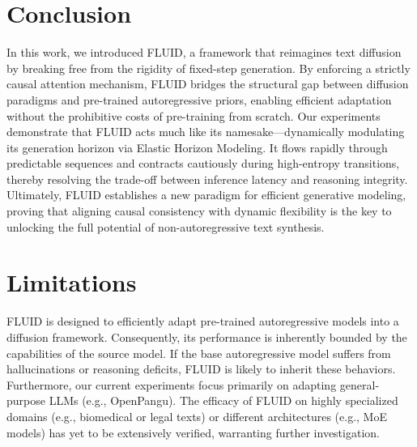 \documentclass[11pt]{article}
\begin{document}
\section{Conclusion}


In this work, we introduced FLUID, a framework that reimagines text diffusion by breaking free from the rigidity of fixed-step generation. By enforcing a strictly causal attention mechanism, FLUID bridges the structural gap between diffusion paradigms and pre-trained autoregressive priors, enabling efficient adaptation without the prohibitive costs of pre-training from scratch. Our experiments demonstrate that FLUID acts much like its namesake—dynamically modulating its generation horizon via Elastic Horizon Modeling. It flows rapidly through predictable sequences and contracts cautiously during high-entropy transitions, thereby resolving the trade-off between inference latency and reasoning integrity. Ultimately, FLUID establishes a new paradigm for efficient generative modeling, proving that aligning causal consistency with dynamic flexibility is the key to unlocking the full potential of non-autoregressive text synthesis.


\section*{Limitations}

FLUID is designed to efficiently adapt pre-trained autoregressive models into a diffusion framework. Consequently, its performance is inherently bounded by the capabilities of the source model. If the base autoregressive model suffers from hallucinations or reasoning deficits, FLUID is likely to inherit these behaviors. Furthermore, our current experiments focus primarily on adapting general-purpose LLMs (e.g., OpenPangu). The efficacy of FLUID on highly specialized domains (e.g., biomedical or legal texts) or different architectures (e.g., MoE models) has yet to be extensively verified, warranting further investigation.
\end{document}
